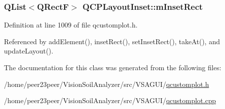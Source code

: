 \subsubsection[{m\+Inset\+Rect}]{\setlength{\rightskip}{0pt plus 5cm}Q\+List$<$Q\+Rect\+F$>$ Q\+C\+P\+Layout\+Inset\+::m\+Inset\+Rect\hspace{0.3cm}{\ttfamily [protected]}}\label{class_q_c_p_layout_inset_aaa8f6b5029458f3d97a65239524a2b33}


Definition at line 1009 of file qcustomplot.\+h.



Referenced by add\+Element(), inset\+Rect(), set\+Inset\+Rect(), take\+At(), and update\+Layout().



The documentation for this class was generated from the following files\+:\begin{DoxyCompactItemize}
\item 
/home/peer23peer/\+Vision\+Soil\+Analyzer/src/\+V\+S\+A\+G\+U\+I/\hyperlink{qcustomplot_8h}{qcustomplot.\+h}\item 
/home/peer23peer/\+Vision\+Soil\+Analyzer/src/\+V\+S\+A\+G\+U\+I/\hyperlink{qcustomplot_8cpp}{qcustomplot.\+cpp}\end{DoxyCompactItemize}
